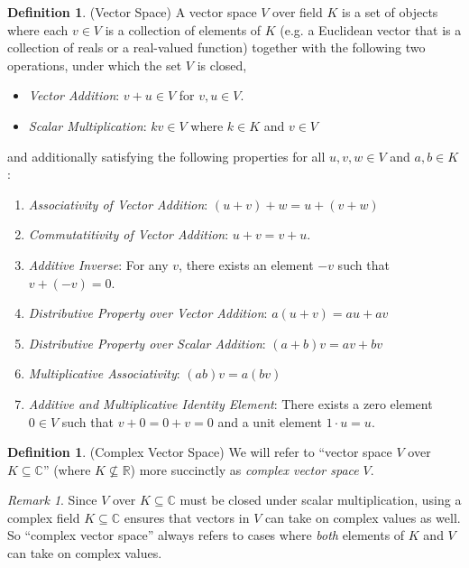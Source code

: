 \documentclass[12pt]{book}
\numberwithin{equation}{section} %
\theoremstyle{plain}
\theoremstyle{definition}
\newtheorem{defn}[thm]{Definition}
\theoremstyle{remark}
\newtheorem*{rmk}{Remark}
\newcommand{\R}{\mathbb{R}}
\newcommand{\C}{\mathbb{C}}
\begin{document}
\begin{defn}(Vector Space)
A vector space $V$ over field $K$ is a set of objects where each $v\in
V$ is a collection of elements of $K$ (e.g. a Euclidean vector that is a
collection of reals or a real-valued function) together with the
following two operations, under which the set $V$ is closed,
\begin{itemize}
  \item \emph{Vector Addition}: $v+u\in V$ for $v,u\in V$.
  \item \emph{Scalar Multiplication}: $kv\in V$ where $k\in K$ and $v\in
    V$
\end{itemize}
and additionally satisfying the following properties for all
$u,v,w\in V$ and $a,b\in K$:
\begin{enumerate}[label=(\roman*)]
  \item \emph{Associativity of Vector Addition}: $(u+v)+w = u + (v+w)$
  \item \emph{Commutatitivity of Vector Addition}: $u+v=v+u$.
  \item \emph{Additive Inverse}: For any $v$, there exists an element
    $-v$ such that $v+(-v)=0$.
  \item \emph{Distributive Property over Vector Addition}:
    $a(u+v) = au + av$
  \item \emph{Distributive Property over Scalar Addition}:
    $(a+b)v = av + bv$
  \item \emph{Multiplicative Associativity}: $(ab)v = a(bv)$
  \item \emph{Additive and Multiplicative Identity Element}:
    There exists a zero element $0\in V$ such that $v+0 = 0+v=0$ and a
    unit element $1\cdot u = u$.
\end{enumerate}
\end{defn}

\begin{defn}(Complex Vector Space)
We will refer to ``vector space $V$ over $K\subseteq\C$'' (where
$K\not\subseteq\R$) more succinctly as \emph{complex vector space} $V$.
\end{defn}

\begin{rmk}
Since $V$ over $K\subseteq\C$ must be closed under scalar
multiplication, using a complex field $K\subseteq\C$ ensures that
vectors in $V$ can take on complex values as well. So ``complex vector
space'' always refers to cases where \emph{both} elements of $K$ and $V$
can take on complex values.
\end{rmk}
\end{document}
